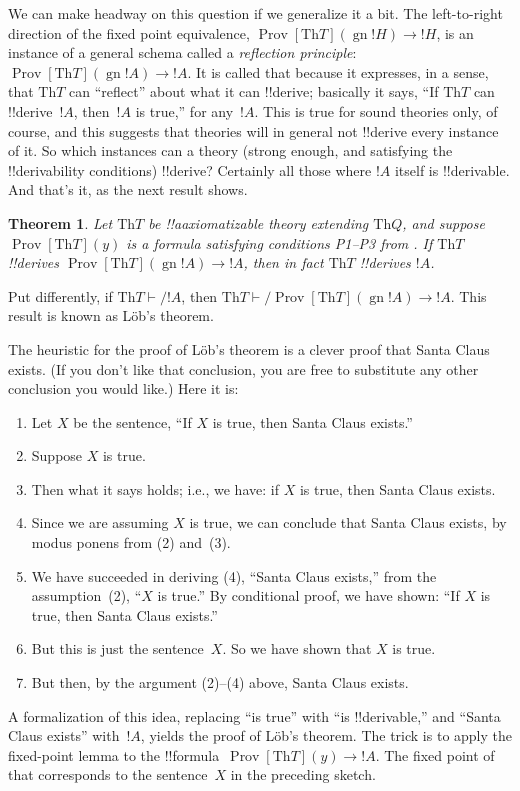 \documentclass[10pt,a4paper]{article}
\makeatletter
\theoremstyle{plain}
\newtheorem{thm}{Theorem}[section]
\theoremstyle{definition}
\theoremstyle{remark}
\newenvironment{explain}{}{}
\newcommand*{\ollabel}[1]{\label{#1}}
\newcommand{\olref}{\@ifnextchar[{\olref@i}{\olref@final}}
\def\olref@i[#1]{\@ifnextchar[{\olref@ii}{\olref@final}}
\def\olref@ii[#1]{\@ifnextchar[{\olref@iii}{\olref@final}}
\def\olref@iii[#1]{\olref@final}
\def\olref@final#1{\ref{#1}}
\providecommand{\lif}{\mathbin{\rightarrow}}
\providecommand{\Proves}{\mathrel{\vdash}}
\providecommand{\Th}{\ensuremath{\mathrm{Th}}}
\providecommand{\gn}{\operatorname{gn}}
\providecommand{\OProv}{\operatorname{Prov}}
\makeatother
\begin{document}
We can make headway on this question if we generalize it a bit. The
left-to-right direction of the fixed point equivalence,
$\OProv[\Th{T}](\gn{!H}) \lif !H$, is an instance of a general schema
called a \emph{reflection principle}: $\OProv[\Th{T}](\gn{!A}) \lif !A$.
It is called that because it expresses, in a sense, that $\Th{T}$ can
``reflect'' about what it can !!{derive}; basically it says, ``If $\Th{T}$
can !!{derive}~$!A$, then~$!A$ is true,'' for any~$!A$.  This is true for
sound theories only, of course, and this suggests that theories will
in general not !!{derive} every instance of it.  So which instances can a
theory (strong enough, and satisfying the !!{derivability} conditions)
!!{derive}?  Certainly all those where $!A$ itself is !!{derivable}. And that's
it, as the next result shows.

\begin{thm}\ollabel{thm:lob}
Let $\Th{T}$ be !!a{axiomatizable} theory extending $\Th{Q}$, and
suppose $\OProv[\Th{T}](y)$ is a formula satisfying conditions P1--P3 from
\olref[2in]{sec}. If $\Th{T}$ !!{derive}s $\OProv[\Th{T}](\gn{!A}) \lif !A$,
then in fact $\Th{T}$ !!{derive}s $!A$.
\end{thm}

Put differently, if $\Th{T} \Proves/ !A$, then $\Th{T} \Proves/
\OProv[\Th{T}](\gn{!A}) \lif !A$. This result is known as L\"ob's
theorem.

\begin{explain}
The heuristic for the proof of L\"ob's theorem is a clever proof that
Santa Claus exists. (If you don't like that conclusion, you are free
to substitute any other conclusion you would like.) Here it is:
\begin{enumerate}
\item Let $X$ be the sentence, ``If $X$ is true, then Santa Claus
  exists.''
\item Suppose $X$ is true.
\item Then what it says holds; i.e., we have: if $X$ is true, then
  Santa Claus exists.
\item Since we are assuming $X$ is true, we can conclude that
  Santa Claus exists, by modus ponens from (2) and~(3).
\item We have succeeded in deriving (4), ``Santa Claus exists,'' from
  the assumption~(2), ``$X$ is true.'' By conditional proof, we have
  shown: ``If $X$ is true, then Santa Claus exists.''
\item But this is just the sentence~$X$. So we have shown that $X$ is
  true.
\item But then, by the argument (2)--(4) above, Santa Claus exists.
\end{enumerate}
A formalization of this idea, replacing ``is true'' with ``is
!!{derivable},'' and ``Santa Claus exists'' with~$!A$, yields the proof of
L\"ob's theorem. The trick is to apply the fixed-point lemma to the
!!{formula}~$\OProv[\Th{T}](y) \lif !A$. The fixed point of that
corresponds to the sentence~$X$ in the preceding sketch.
\end{explain}
\end{document}
